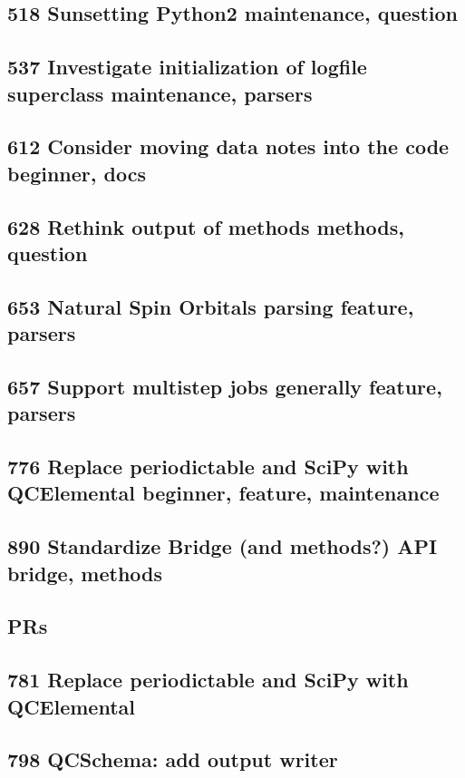 \subsection{518 Sunsetting Python2 maintenance, question}
\subsection{537 Investigate initialization of logfile superclass maintenance, parsers}
\subsection{612 Consider moving data notes into the code beginner, docs}
\subsection{628 Rethink output of methods methods, question}
\subsection{653 Natural Spin Orbitals parsing feature, parsers}
\subsection{657 Support multistep jobs generally feature, parsers}
\subsection{776 Replace periodictable and SciPy with QCElemental beginner, feature, maintenance}
\subsection{890 Standardize Bridge (and methods?) API bridge, methods}
\subsection{PRs}
\subsection{781 Replace periodictable and SciPy with QCElemental}
\subsection{798 QCSchema: add output writer}
